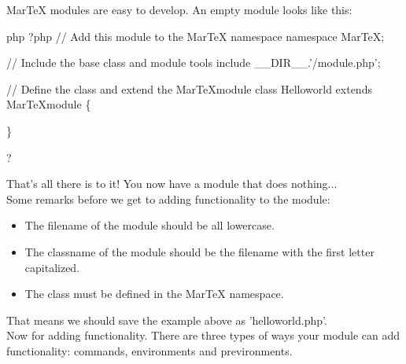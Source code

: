 \begin{paragraph}
  MarTeX modules are easy to develop. An empty module looks like this: 
\end{paragraph}

\begin{code}{php}
\<?php
// Add this module to the MarTeX namespace
namespace MarTeX;

// Include the base class and module tools
include __DIR__.'/module.php';

// Define the class and extend the MarTeXmodule
class Helloworld extends MarTeXmodule \{

\}

?\>   
\end{code}
That's all there is to it! You now have a module that does nothing...\\
Some remarks before we get to adding functionality to the module:
\begin{itemize}
 \item{The filename of the module should be all lowercase.}
 \item{The classname of the module should be the filename with the first letter capitalized.}
 \item{The class must be defined in the MarTeX namespace.}
\end{itemize}
That means we should save the example above as 'helloworld.php'.\\
Now for adding functionality. There are three types of ways your module can add functionality: commands, environments and previronments. 
